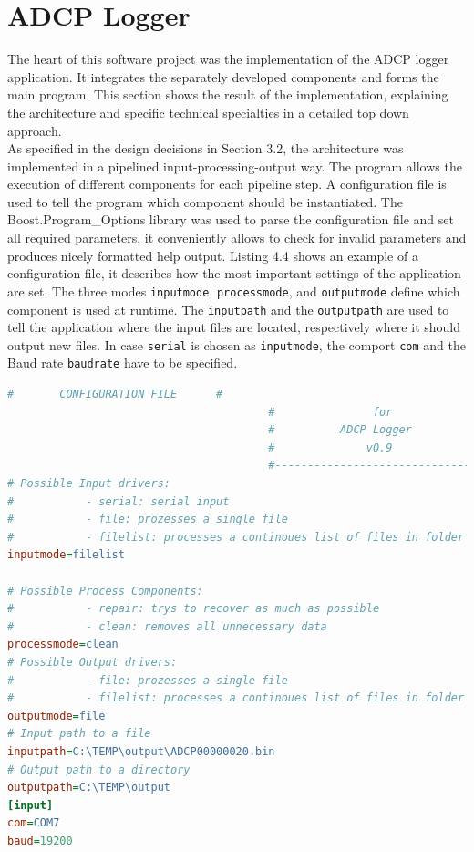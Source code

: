 \section{ADCP Logger}
The heart of this software project was the implementation of the ADCP logger application. It integrates the separately developed components and forms the main program. This section shows the result of the implementation, explaining the architecture and specific technical specialties in a detailed top down approach.\\
As specified in the design decisions in Section 3.2, the architecture was implemented in a pipelined input-processing-output way. The program allows the execution of different components for each pipeline step. A configuration file is used to tell the program which component should be instantiated. The Boost.Program\_Options library was used to parse the configuration file and set all required parameters, it conveniently allows to check for invalid parameters and produces nicely formatted help output. Listing 4.4 shows an example of a configuration file, it describes how the most important settings of the application are set. The three modes \texttt{inputmode}, \texttt{processmode}, and \texttt{outputmode} define which component is used at runtime. The \texttt{inputpath} and the \texttt{outputpath} are used to tell the application where the input files are located, respectively where it should output new files. In case \texttt{serial} is chosen as \texttt{inputmode}, the comport \texttt{com} and the Baud rate \texttt{baudrate} have to be specified. 
\vspace{1em}
\begin{lstlisting}[language={Ini}, caption=A snippet of a configuration file for the ADCP logger application.]
                                        #       CONFIGURATION FILE      #
                                        #               for             #
                                        #          ADCP Logger          #
                                        #              v0.9             #
                                        #-------------------------------#
# Possible Input drivers:
#           - serial: serial input
#           - file: prozesses a single file
#           - filelist: processes a continoues list of files in folder
inputmode=filelist

# Possible Process Components:
#           - repair: trys to recover as much as possible
#           - clean: removes all unnecessary data
processmode=clean
# Possible Output drivers:
#           - file: prozesses a single file
#           - filelist: processes a continoues list of files in folder
outputmode=file
# Input path to a file
inputpath=C:\TEMP\output\ADCP00000020.bin
# Output path to a directory
outputpath=C:\TEMP\output
[input]
com=COM7
baud=19200
\end{lstlisting}
